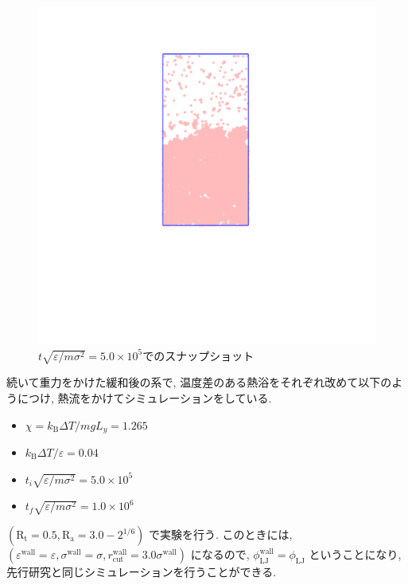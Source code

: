 \begin{figure}[H]
  \centering
  \includegraphics[scale=0.2]{image/drop5000.png}
  \caption{$t \sqrt{\varepsilon / m \sigma^2} = 5.0 \times 10^{5}$でのスナップショット}
  \label{}
\end{figure}

続いて重力をかけた緩和後の系で, 温度差のある熱浴をそれぞれ改めて以下のようにつけ, 熱流をかけてシミュレーションをしている. 

\begin{itemize}
  \item $\chi = k_{\text{B}}\Delta T / mg L_y = 1.265$
  \item $k_{\text{B}} \Delta T/\varepsilon = 0.04$
  \item $t_i \sqrt{\varepsilon / m \sigma^2} = 5.0 \times 10^{5}$
  \item $t_f \sqrt{\varepsilon / m \sigma^2} = 1.0 \times 10^{6}$
\end{itemize}

$(\text{R}_\text{t} = 0.5, \text{R}_\text{a} = 3.0 - 2^{1/6})$ で実験を行う. このときには, $(\varepsilon^{\text{wall}} = \varepsilon, \sigma^{\text{wall}} = \sigma, r^{\text{wall}}_{\text{cut}} = 3.0 \sigma^{\text{wall}})$ になるので, ${\phi_{\text{LJ}}^{\text{wall}}} = \phi_{\text{LJ}}$ ということになり, 先行研究と同じシミュレーションを行うことができる.

